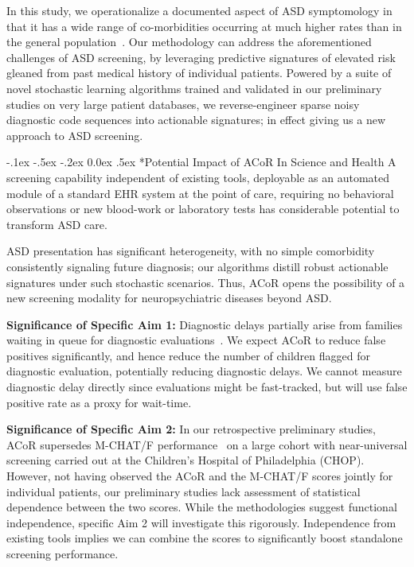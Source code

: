 \documentclass[onecolumn, compsoc,11pt]{IEEEtran}
\makeatletter
\renewcommand\paragraph{\@startsection {section}{1}{\z@}%
                                   {-.1ex \@plus -.5ex \@minus -.2ex}%
                                   {0.0ex \@plus.5ex}%
                                   {\fontsize{11}{10}\selectfont\bfseries\itshape\sffamily\color{black}}}
\def\ZERO{ACoR\xspace}
\def\acor{ACoR\xspace}
\makeatother
\begin{document}
In this study, we operationalize a documented aspect of ASD symptomology in  that it has   a wide range  of co-morbidities occurring at much higher rates than in the general population~\cite{hyman2020identification}.
Our methodology  can address the aforementioned   challenges of ASD screening, by leveraging predictive signatures of  elevated risk gleaned from past medical history of individual  patients. Powered by a suite of  novel stochastic learning algorithms trained and validated in our preliminary studies on very large patient databases, we  reverse-engineer sparse noisy diagnostic code sequences into actionable signatures; in effect giving us  a  new approach to ASD screening.

\paragraph*{Potential  Impact  of  \ZERO In Science and Health}
A  screening capability  independent of existing tools, deployable as an automated module  of a standard EHR system at the point of care, requiring no behavioral observations or  new blood-work or laboratory tests has considerable  potential to transform ASD care. 

ASD presentation has significant heterogeneity, with no simple comorbidity  consistently signaling future  diagnosis; our algorithms distill robust actionable signatures under such stochastic scenarios. Thus,  \acor opens the possibility of a new screening modality for  neuropsychiatric diseases beyond ASD.

\textbf{Significance of Specific Aim 1:} 
Diagnostic delays partially arise from families waiting in queue for diagnostic evaluations~\cite{gordon2016whittling}. 
We expect \ZERO to reduce  false positives significantly, and hence  reduce the number of children  flagged for diagnostic evaluation,  potentially  reducing diagnostic delays. We cannot measure diagnostic delay directly  since evaluations might be fast-tracked, but will use false positive rate as a proxy for wait-time. 

\textbf{Significance of Specific Aim 2:} 
In our retrospective  preliminary studies,  \ZERO supersedes M-CHAT/F  performance~\cite{pmid31562252} on a large  cohort with near-universal screening carried out at the Children's Hospital of Philadelphia (CHOP). However, not having observed the \ZERO and the M-CHAT/F scores jointly for individual patients, our preliminary studies lack  assessment of statistical dependence between the two scores. While the  methodologies  suggest functional independence, specific Aim 2 will investigate this rigorously. Independence from existing tools implies  we can   combine the scores to significantly boost standalone  screening performance.
\end{document}
